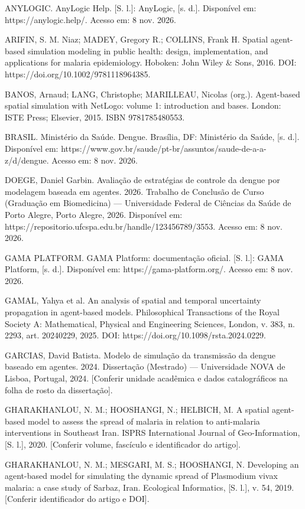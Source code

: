 ANYLOGIC. AnyLogic Help. {[}S. l.{]}: AnyLogic, {[}s. d.{]}. Disponível
em: https://anylogic.help/. Acesso em: 8 nov. 2026.

ARIFIN, S. M. Niaz; MADEY, Gregory R.; COLLINS, Frank H. Spatial
agent-based simulation modeling in public health: design,
implementation, and applications for malaria epidemiology. Hoboken: John
Wiley \& Sons, 2016. DOI: https://doi.org/10.1002/9781118964385.

BANOS, Arnaud; LANG, Christophe; MARILLEAU, Nicolas (org.). Agent-based
spatial simulation with NetLogo: volume 1: introduction and bases.
London: ISTE Press; Elsevier, 2015. ISBN 9781785480553.

BRASIL. Ministério da Saúde. Dengue. Brasília, DF: Ministério da Saúde,
{[}s. d.{]}. Disponível em:
https://www.gov.br/saude/pt-br/assuntos/saude-de-a-a-z/d/dengue. Acesso
em: 8 nov. 2026.

DOEGE, Daniel Garbin. Avaliação de estratégias de controle da dengue por
modelagem baseada em agentes. 2026. Trabalho de Conclusão de Curso
(Graduação em Biomedicina) --- Universidade Federal de Ciências da Saúde
de Porto Alegre, Porto Alegre, 2026. Disponível em:
https://repositorio.ufcspa.edu.br/handle/123456789/3553. Acesso em: 8
nov. 2026.

GAMA PLATFORM. GAMA Platform: documentação oficial. {[}S. l.{]}: GAMA
Platform, {[}s. d.{]}. Disponível em: https://gama-platform.org/. Acesso
em: 8 nov. 2026.

GAMAL, Yahya et al. An analysis of spatial and temporal uncertainty
propagation in agent-based models. Philosophical Transactions of the
Royal Society A: Mathematical, Physical and Engineering Sciences,
London, v. 383, n. 2293, art. 20240229, 2025. DOI:
https://doi.org/10.1098/rsta.2024.0229.

GARCIAS, David Batista. Modelo de simulação da transmissão da dengue
baseado em agentes. 2024. Dissertação (Mestrado) --- Universidade NOVA
de Lisboa, Portugal, 2024. {[}Conferir unidade acadêmica e dados
catalográficos na folha de rosto da dissertação{]}.

GHARAKHANLOU, N. M.; HOOSHANGI, N.; HELBICH, M. A spatial agent-based
model to assess the spread of malaria in relation to anti-malaria
interventions in Southeast Iran. ISPRS International Journal of
Geo-Information, {[}S. l.{]}, 2020. {[}Conferir volume, fascículo e
identificador do artigo{]}.

GHARAKHANLOU, N. M.; MESGARI, M. S.; HOOSHANGI, N. Developing an
agent-based model for simulating the dynamic spread of Plasmodium vivax
malaria: a case study of Sarbaz, Iran. Ecological Informatics, {[}S.
l.{]}, v. 54, 2019. {[}Conferir identificador do artigo e DOI{]}.

